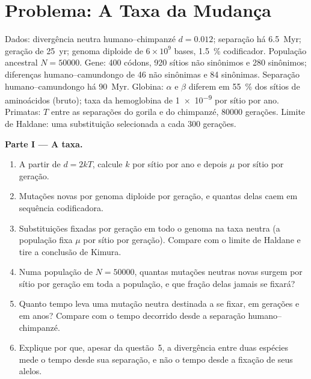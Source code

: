 \section{Problema: A Taxa da Mudança}

\begin{problem}
\label{pb:b3:molecular-evolution:1}
Dados: divergência neutra humano--chimpanzé $d = 0.012$; separação há
\qty{6.5}{Myr}; geração de \qty{25}{yr}; genoma diploide de $6\times
10^{9}$ bases, \qty{1.5}{\%} codificador. População ancestral $N =
\num{50000}$. Gene: 400 códons, 920 sítios não sinônimos e 280 sinônimos;
diferenças humano--camundongo de 46 não sinônimas e 84 sinônimas.
Separação humano--camundongo há \qty{90}{Myr}. Globina: $\alpha$ e
$\beta$ diferem em \qty{55}{\%} dos sítios de aminoácidos (bruto); taxa
da hemoglobina de \num{1e-9} por sítio por ano. Primatas: $T$ entre as
separações do gorila e do chimpanzé, \num{80000} gerações. Limite de
Haldane: uma substituição selecionada a cada 300 gerações.

\medskip
\noindent\textbf{Parte I --- A taxa.}
\begin{enumerate}
  \item A partir de $d = 2kT$, calcule $k$ por sítio por ano e depois
        $\mu$ por sítio por geração.
  \item Mutações novas por genoma diploide por geração, e quantas delas
        caem em sequência codificadora.
  \item Substituições fixadas por geração em todo o genoma na taxa neutra
        (a população fixa $\mu$ por sítio por geração). Compare com o
        limite de Haldane e tire a conclusão de Kimura.
  \item Numa população de $N = \num{50000}$, quantas mutações neutras
        novas surgem por sítio por geração em toda a população, e que
        fração delas jamais se fixará?
  \item Quanto tempo leva uma mutação neutra destinada a se fixar, em
        gerações e em anos? Compare com o tempo decorrido desde a
        separação humano--chimpanzé.
  \item Explique por que, apesar da questão~5, a divergência entre duas
        espécies mede o tempo desde sua separação, e não o tempo desde a
        fixação de seus alelos.
\end{enumerate}


\end{problem}
